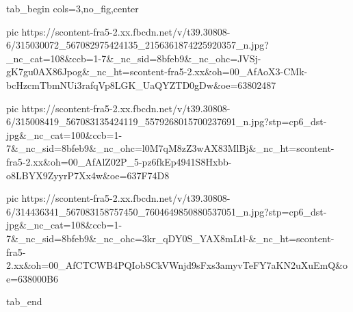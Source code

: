  
 
 
 
 

\ifcmt
  tab_begin cols=3,no_fig,center

     pic https://scontent-fra5-2.xx.fbcdn.net/v/t39.30808-6/315030072_567082975424135_2156361874225920357_n.jpg?_nc_cat=108&ccb=1-7&_nc_sid=8bfeb9&_nc_ohc=JVSj-gK7gu0AX86Jpog&_nc_ht=scontent-fra5-2.xx&oh=00_AfAoX3-CMk-bcHzcmTbmNUi3rafqVp8LGK_UaQYZTD0gDw&oe=63802487

     pic https://scontent-fra5-2.xx.fbcdn.net/v/t39.30808-6/315008419_567083135424119_5579268015700237691_n.jpg?stp=cp6_dst-jpg&_nc_cat=100&ccb=1-7&_nc_sid=8bfeb9&_nc_ohc=l0M7qM8zZ3wAX83MlBj&_nc_ht=scontent-fra5-2.xx&oh=00_AfAlZ02P_5-pz6fkEp4941S8Hxbb-o8LBYX9ZyyrP7Xx4w&oe=637F74D8

     pic https://scontent-fra5-2.xx.fbcdn.net/v/t39.30808-6/314436341_567083158757450_7604649850880537051_n.jpg?stp=cp6_dst-jpg&_nc_cat=108&ccb=1-7&_nc_sid=8bfeb9&_nc_ohc=3kr_qDY0S_YAX8mLtl-&_nc_ht=scontent-fra5-2.xx&oh=00_AfCTCWB4PQIobSCkVWnjd9sFxs3amyvTeFY7aKN2uXuEmQ&oe=638000B6

  tab_end
\fi
